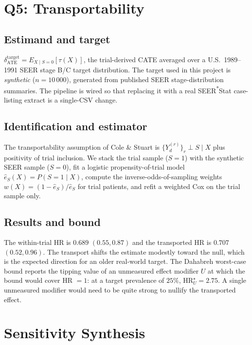 \documentclass[conference]{IEEEtran}
\begin{document}
\section{Q5: Transportability}

\subsection{Estimand and target}

$\delta_\text{ATE}^\text{target} = E_{X \mid S{=}0}[\tau(X)]$, the trial-derived CATE averaged over a U.S.\ 1989--1991 SEER stage B/C target distribution. The target used in this project is \emph{synthetic} ($n = 10\,000$), generated from published SEER stage-distribution summaries. The pipeline is wired so that replacing it with a real SEER\textsuperscript{*}Stat case-listing extract is a single-CSV change.

\subsection{Identification and estimator}

The transportability assumption of Cole \& Stuart \cite{cole2010} is $\{Y_d^{(r)}\}_r \perp S \mid X$ plus positivity of trial inclusion. We stack the trial sample ($S{=}1$) with the synthetic SEER sample ($S{=}0$), fit a logistic propensity-of-trial model $\hat e_S(X) = P(S{=}1 \mid X)$, compute the inverse-odds-of-sampling weights $w(X) = (1 - \hat e_S) / \hat e_S$ for trial patients, and refit a weighted Cox on the trial sample only.

\subsection{Results and bound}

The within-trial HR is $0.689$ $(0.55, 0.87)$ and the transported HR is $0.707$ $(0.52, 0.96)$. The transport shifts the estimate modestly toward the null, which is the expected direction for an older real-world target. The Dahabreh worst-case bound \cite{dahabreh2019} reports the tipping value of an unmeasured effect modifier $U$ at which the bound would cover HR $=1$: at a target prevalence of $25\%$, $\mathrm{HR}_U^\star = 2.75$. A single unmeasured modifier would need to be quite strong to nullify the transported effect.

\section{Sensitivity Synthesis}
\end{document}
